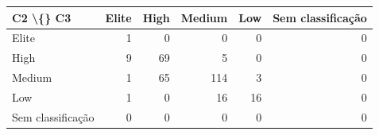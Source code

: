 \begin{tabular}{lrrrrr}
\hline
C2 \textbackslash\{\} C3 & Elite & High & Medium & Low & Sem classificação \\
\hline
Elite & 1 & 0 & 0 & 0 & 0 \\
High & 9 & 69 & 5 & 0 & 0 \\
Medium & 1 & 65 & 114 & 3 & 0 \\
Low & 1 & 0 & 16 & 16 & 0 \\
Sem classificação & 0 & 0 & 0 & 0 & 0 \\
\hline
\end{tabular}
